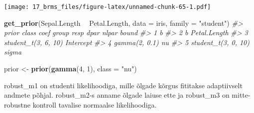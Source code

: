 \documentclass[]{book}
\newenvironment{Shaded}{\begin{snugshade}}{\end{snugshade}}
\newcommand{\KeywordTok}[1]{\textcolor[rgb]{0.13,0.29,0.53}{\textbf{#1}}}
\newcommand{\DataTypeTok}[1]{\textcolor[rgb]{0.13,0.29,0.53}{#1}}
\newcommand{\DecValTok}[1]{\textcolor[rgb]{0.00,0.00,0.81}{#1}}
\newcommand{\StringTok}[1]{\textcolor[rgb]{0.31,0.60,0.02}{#1}}
\newcommand{\CommentTok}[1]{\textcolor[rgb]{0.56,0.35,0.01}{\textit{#1}}}
\newcommand{\OperatorTok}[1]{\textcolor[rgb]{0.81,0.36,0.00}{\textbf{#1}}}
\newcommand{\NormalTok}[1]{#1}
\begin{document}
\texttt{[image: 17\_brms\_files/figure-latex/unnamed-chunk-65-1.pdf]}

\begin{Shaded}
\begin{Highlighting}[]
\KeywordTok{get_prior}\NormalTok{(Sepal.Length }\OperatorTok{~}\StringTok{ }\NormalTok{Petal.Length, }\DataTypeTok{data =}\NormalTok{ iris, }\DataTypeTok{family =} \StringTok{"student"}\NormalTok{)}
\CommentTok{#>                 prior     class         coef group resp dpar nlpar bound}
\CommentTok{#> 1                             b                                         }
\CommentTok{#> 2                             b Petal.Length                            }
\CommentTok{#> 3 student_t(3, 6, 10) Intercept                                         }
\CommentTok{#> 4       gamma(2, 0.1)        nu                                         }
\CommentTok{#> 5 student_t(3, 0, 10)     sigma}
\end{Highlighting}
\end{Shaded}

\begin{Shaded}
\begin{Highlighting}[]
\NormalTok{prior <-}\StringTok{ }\KeywordTok{prior}\NormalTok{(}\KeywordTok{gamma}\NormalTok{(}\DecValTok{4}\NormalTok{, }\DecValTok{1}\NormalTok{), }\DataTypeTok{class =} \StringTok{"nu"}\NormalTok{)}
\end{Highlighting}
\end{Shaded}

robust\_m1 on studenti likelihoodiga, mille õlgade kõrgus fititakse
adaptiivselt andmete põhjal. robust\_m2-s anname õlgade laiuse ette ja
robust\_m3 on mitte-robustne kontroll tavalise normaalse likelihoodiga.
\end{document}
